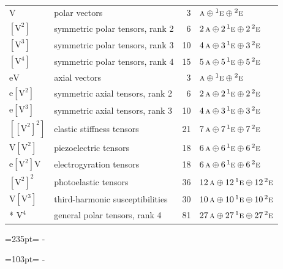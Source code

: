 \documentclass[10pt,a4paper]{article}
\newcommand{\needspace}[1]{\par\penalty-100\begingroup\dimen0=#1\relax\dimen2=\pagegoal
  \advance\dimen2-\pagetotal\ifdim\dimen0>\dimen2\relax\ifdim\dimen2>0pt\vfil\break\fi\fi
  \endgroup}
\numberwithin{equation}{section}
\newcommand{\irr}[1]{\text{\normalfont\scshape #1}}
\newcommand{\conjpair}[1]{{}^{#1}}
\newcommand{\jahn}[1]{\mathrm{#1}}
\newlength{\fillwidth}\newlength{\cellwidth}\newlength{\colwidth}
\begin{document}
{\begin{longtable}{@{}llr>{\RaggedRight\arraybackslash}p{\fillwidth}@{}}
$\jahn{V}$ & polar vectors & 3 & $\irr{a} \oplus\allowbreak \conjpair{1}\irr{e} \oplus\allowbreak \conjpair{2}\irr{e}$\\
$\jahn{[V^{2}]}$ & symmetric polar tensors, rank 2 & 6 & $2\,\irr{a} \oplus\allowbreak 2\,\conjpair{1}\irr{e} \oplus\allowbreak 2\,\conjpair{2}\irr{e}$\\
$\jahn{[V^{3}]}$ & symmetric polar tensors, rank 3 & 10 & $4\,\irr{a} \oplus\allowbreak 3\,\conjpair{1}\irr{e} \oplus\allowbreak 3\,\conjpair{2}\irr{e}$\\
$\jahn{[V^{4}]}$ & symmetric polar tensors, rank 4 & 15 & $5\,\irr{a} \oplus\allowbreak 5\,\conjpair{1}\irr{e} \oplus\allowbreak 5\,\conjpair{2}\irr{e}$\\
$\jahn{eV}$ & axial vectors & 3 & $\irr{a} \oplus\allowbreak \conjpair{1}\irr{e} \oplus\allowbreak \conjpair{2}\irr{e}$\\
$\jahn{e[V^{2}]}$ & symmetric axial tensors, rank 2 & 6 & $2\,\irr{a} \oplus\allowbreak 2\,\conjpair{1}\irr{e} \oplus\allowbreak 2\,\conjpair{2}\irr{e}$\\
$\jahn{e[V^{3}]}$ & symmetric axial tensors, rank 3 & 10 & $4\,\irr{a} \oplus\allowbreak 3\,\conjpair{1}\irr{e} \oplus\allowbreak 3\,\conjpair{2}\irr{e}$\\
$\jahn{[[V^{2}]^{2}]}$ & elastic stiffness tensors & 21 & $7\,\irr{a} \oplus\allowbreak 7\,\conjpair{1}\irr{e} \oplus\allowbreak 7\,\conjpair{2}\irr{e}$\\
$\jahn{V[V^{2}]}$ & piezoelectric tensors & 18 & $6\,\irr{a} \oplus\allowbreak 6\,\conjpair{1}\irr{e} \oplus\allowbreak 6\,\conjpair{2}\irr{e}$\\
$\jahn{e[V^{2}]V}$ & electrogyration tensors & 18 & $6\,\irr{a} \oplus\allowbreak 6\,\conjpair{1}\irr{e} \oplus\allowbreak 6\,\conjpair{2}\irr{e}$\\
$\jahn{[V^{2}]^{2}}$ & photoelastic tensors & 36 & $12\,\irr{a} \oplus\allowbreak 12\,\conjpair{1}\irr{e} \oplus\allowbreak 12\,\conjpair{2}\irr{e}$\\
$\jahn{V[V^{3}]}$ & third-harmonic susceptibilities & 30 & $10\,\irr{a} \oplus\allowbreak 10\,\conjpair{1}\irr{e} \oplus\allowbreak 10\,\conjpair{2}\irr{e}$\\*
$\jahn{V^{4}}$ & general polar tensors, rank 4 & 81 & $27\,\irr{a} \oplus\allowbreak 27\,\conjpair{1}\irr{e} \oplus\allowbreak 27\,\conjpair{2}\irr{e}$\\
\bottomrule\end{longtable}}
\needspace{235pt}
\needspace{103pt}
\end{document}
